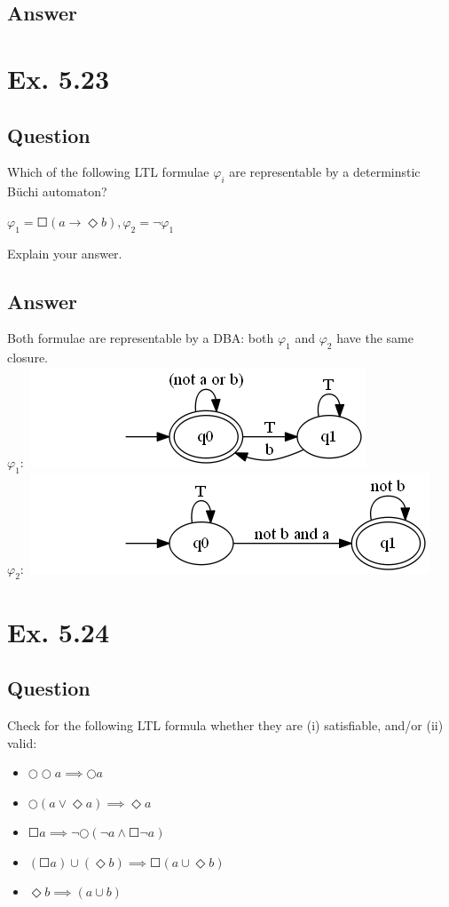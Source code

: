 \documentclass[12pt]{article}
\begin{document}
\subsection*{Answer}

\newpage
\section*{Ex. 5.23}
\subsection*{Question}
Which of the following LTL formulae $\varphi_i$ are representable by a determinstic B\"uchi automaton?
\begin{center}
	$\varphi_1 = \Square(a\rightarrow\Diamond b), \varphi_2 = \neg\varphi_1$
\end{center}
Explain your answer.

\subsection*{Answer}
Both formulae are representable by a DBA: both $\varphi_1$ and $\varphi_2$ have the same closure.\\
$\varphi_1:$ \includegraphics*[scale=0.6]{ex523a.png}\\
$\varphi_2:$ \includegraphics*[scale=0.6]{ex523b.png}

\newpage
\section*{Ex. 5.24}
\subsection*{Question}
Check for the following LTL formula whether they are (i) satisfiable, and/or (ii)
valid:
\begin{itemize}
	\item $\Circle\Circle a \implies \Circle a$
	\item $\Circle(a\vee\Diamond a) \implies\Diamond a$
	\item $\Square a\implies \neg\Circle(\neg a\wedge\Square\neg a)$
	\item $(\Square a)\cup(\Diamond b) \implies \Square(a\cup\Diamond b)$
	\item $\Diamond b\implies (a\cup b)$
\end{itemize}
\end{document}
